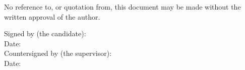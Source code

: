 \vspace{0.4cm}
\noindent No reference to, or quotation from, this document may be made without the written approval
of the author.

\vspace{1.2cm}
\noindent Signed by (the candidate): \dotfill\\[0.6cm]
\noindent Date: \dotfill\\[1.0cm]
\noindent Countersigned by (the supervisor): \dotfill\\[0.6cm]
\noindent Date: \dotfill
\clearpage
